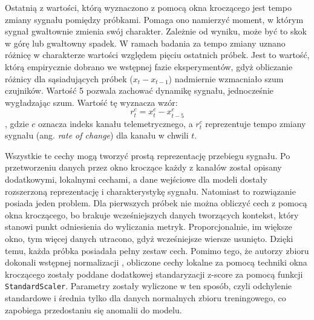 \documentclass[a4paper,twoside,12pt]{book}
\newcommand{\obcy}[1]{\emph{#1}}
\newcommand{\english}[1]{{\selectlanguage{british}\obcy{#1}}}
\begin{document}
	Ostatnią z wartości, którą wyznaczono z pomocą okna kroczącego jest tempo zmiany sygnału pomiędzy próbkami. Pomaga ono namierzyć moment, w którym sygnał gwałtownie zmienia swój charakter. Zależnie od wyniku, może być to skok w górę lub gwałtowny spadek. W ramach badania za tempo zmiany uznano różnicę w charakterze wartości względem pięciu ostatnich próbek. Jest to wartość, którą empirycznie dobrano we wstępnej fazie eksperymentów, gdyż obliczanie różnicy dla sąsiadujących próbek ($x_t - x_{t-1}$) nadmiernie wzmacniało szum czujników. Wartość 5 pozwala zachować dynamikę sygnału, jednocześnie wygładzając szum. Wartość tę wyznacza wzór: 
	\begin{equation}
		r_t^c = x_t^c - x_{t-5}^c
	\end{equation},
	gdzie $c$ oznacza indeks kanału telemetrycznego, a $r_t^c$ reprezentuje tempo zmiany sygnału (ang. \english{rate of change}) dla kanału w chwili $t$.
	
	
	
	Wszystkie te cechy mogą tworzyć prostą reprezentację przebiegu sygnału. Po przetworzeniu danych przez okno kroczące każdy z kanałów został opisany dodatkowymi, lokalnymi cechami, a dane wejściowe dla modeli dostały rozszerzoną reprezentację i charakterystykę sygnału. Natomiast to rozwiązanie posiada jeden problem. Dla pierwszych próbek nie można obliczyć cech z pomocą okna kroczącego, bo brakuje wcześniejszych danych tworzących kontekst, który stanowi punkt odniesienia do wyliczania metryk. Proporcjonalnie, im większe okno, tym więcej danych utracono, gdyż wcześniejsze wiersze usunięto. Dzięki temu, każda próbka posiadała pełny zestaw cech. Pomimo tego, że autorzy zbioru dokonali wstępnej normalizacji \cite{kotowski2024esaadb}, obliczone cechy lokalne za pomocą techniki okna kroczącego zostały poddane dodatkowej standaryzacji z-score za pomocą funkcji \texttt{StandardScaler}. Parametry zostały wyliczone w ten sposób, czyli odchylenie standardowe i średnia tylko dla danych normalnych zbioru treningowego, co zapobiega przedostaniu się anomalii do modelu.
	
\end{document}
